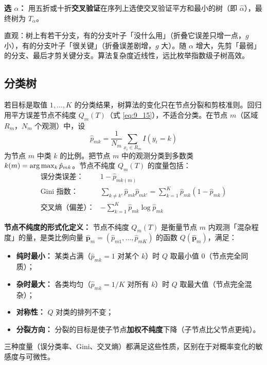 \textbf{选 $\alpha$：} 用五折或十折\textbf{交叉验证}在序列上选使交叉验证平方和最小的树（即 $\hat\alpha$），最终树为 $T_{\hat\alpha}$。

\begin{remark}
    直观：树上有若干分支，有的分支叶子「没什么用」（折叠它误差只增一点，$g$ 小），有的分支叶子「很关键」（折叠误差剧增，$g$ 大）。随 $\alpha$ 增大，先剪「最弱」的分支、最后才剪关键分支。算法复杂度近线性，远比枚举指数级子树高效。
\end{remark}

\subsection{分类树}

若目标是取值 $1, \ldots, K$ 的分类结果，树算法的变化只在节点分裂和剪枝准则。回归用平方误差节点不纯度 $Q_m(T)$（式 \eqref{eq:9_15}），不适合分类。在节点 $m$（区域 $R_m$，$N_m$ 个观测）中，设
\[
    \hat p_{mk} = \frac{1}{N_m}\sum_{x_i \in R_m} I(y_i = k)
\]
为节点 $m$ 中类 $k$ 的比例。把节点 $m$ 中的观测分类到多数类 $k(m) = \arg\max_k \hat p_{mk}$。节点不纯度 $Q_m(T)$ 的度量包括：
\begin{equation}\label{eq:9_17}
    \begin{aligned}
        \text{误分类误差：} & 1 - \hat p_{mk(m)} \\
        \text{Gini 指数：} & \sum_{k \neq k'} \hat p_{mk}\hat p_{mk'} = \sum_{k=1}^{K}\hat p_{mk}(1 - \hat p_{mk}) \\
        \text{交叉熵（偏差）：} & -\sum_{k=1}^{K}\hat p_{mk}\log\hat p_{mk}
    \end{aligned}
\end{equation}

\textbf{节点不纯度的形式化定义：} 节点不纯度 $Q_m(T)$ 是衡量节点 $m$ 内观测「混杂程度」的量，是类比例向量 $\hat{\mathbf p}_m = (\hat p_{m1}, \ldots, \hat p_{mK})$ 的函数 $Q(\hat{\mathbf p}_m)$，满足：
\begin{itemize}
    \item \textbf{纯时最小：} 某类占满（$\hat p_{mk} = 1$ 对某个 $k$）时 $Q$ 取最小值 $0$（节点完全同质）；
    \item \textbf{杂时最大：} 各类均匀（$\hat p_{mk} = 1/K$ 对所有 $k$）时 $Q$ 取最大值（节点完全混杂）；
    \item \textbf{对称性：} $Q$ 对类的排列不变；
    \item \textbf{分裂方向：} 分裂的目标是使子节点\textbf{加权不纯度}下降（子节点比父节点更纯）。
\end{itemize}
三种度量（误分类率、Gini、交叉熵）都满足这些性质，区别在于对概率变化的敏感度与可微性。

